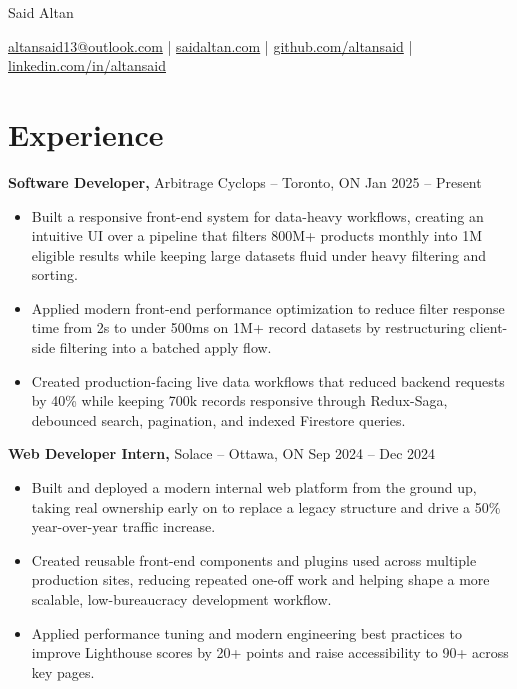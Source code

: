 \documentclass[11pt]{article}       %
\begin{document}
\centerline{\Huge Said Altan}

\vspace{10pt}

\centerline{\href{mailto:altansaid13@outlook.com}{altansaid13@outlook.com} | \href{https://saidaltan.com}{saidaltan.com} | \href{https://github.com/altansaid}{github.com/altansaid} | \href{https://www.linkedin.com/in/altansaid}{linkedin.com/in/altansaid}}


\vspace{5pt}
\section*{Experience}
\textbf{Software Developer,} {Arbitrage Cyclops} -- Toronto, ON \hfill Jan 2025 -- Present \\
\vspace{-9pt}
\begin{itemize}
  \item Built a responsive front-end system for data-heavy workflows, creating an intuitive UI over a pipeline that filters 800M+ products monthly into 1M eligible results while keeping large datasets fluid under heavy filtering and sorting.
  \item Applied modern front-end performance optimization to reduce filter response time from 2s to under 500ms on 1M+ record datasets by restructuring client-side filtering into a batched apply flow.
  \item Created production-facing live data workflows that reduced backend requests by 40\% while keeping 700k records responsive through Redux-Saga, debounced search, pagination, and indexed Firestore queries.
\end{itemize}

\textbf{Web Developer Intern,} {Solace} -- Ottawa, ON \hfill Sep 2024 -- Dec 2024 \\
\vspace{-9pt}
\begin{itemize}
  \item Built and deployed a modern internal web platform from the ground up, taking real ownership early on to replace a legacy structure and drive a 50\% year-over-year traffic increase.
  \item Created reusable front-end components and plugins used across multiple production sites, reducing repeated one-off work and helping shape a more scalable, low-bureaucracy development workflow.
  \item Applied performance tuning and modern engineering best practices to improve Lighthouse scores by 20+ points and raise accessibility to 90+ across key pages.
\end{itemize}
\end{document}
